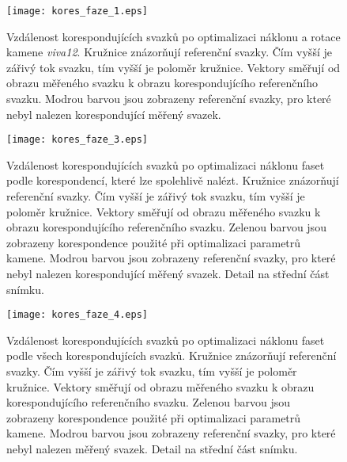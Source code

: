  
 \begin{figure}[htbp]
    \centering\texttt{[image: kores\_faze\_1.eps]}
    \caption[Vzdálenost korespondujících svazků - fáze 0.]{Vzdálenost korespondujících svazků po optimalizaci náklonu a rotace kamene \textit{viva12}. Kružnice znázorňují referenční svazky. Čím vyšší je zářivý tok svazku, tím vyšší je poloměr kružnice. Vektory směřují od obrazu měřeného svazku k obrazu korespondujícího referenčního svazku. Modrou barvou jsou zobrazeny referenční svazky, pro které nebyl nalezen korespondující měřený svazek.}
 \label{fig: kores_faze_0}
 \end{figure}

 
 \begin{figure}[htbp]
    \centering\texttt{[image: kores\_faze\_3.eps]}
    \caption[Vzdálenost korespondujících svazků - fáze 1.]{Vzdálenost korespondujících svazků po optimalizaci náklonu faset podle korespondencí, které lze spolehlivě nalézt. Kružnice znázorňují referenční svazky. Čím vyšší je zářivý tok svazku, tím vyšší je poloměr kružnice. Vektory směřují od obrazu měřeného svazku k obrazu korespondujícího referenčního svazku. Zelenou barvou jsou zobrazeny korespondence použité při optimalizaci parametrů kamene. Modrou barvou jsou zobrazeny referenční svazky, pro které nebyl nalezen korespondující měřený svazek. Detail na střední část snímku.}
 \label{fig: kores_faze_1}
 \end{figure}
 
  \begin{figure}[htbp]
    \centering\texttt{[image: kores\_faze\_4.eps]}
    \caption[Vzdálenost korespondujících svazků - konečná fáze.]{Vzdálenost korespondujících svazků po optimalizaci náklonu faset podle všech korespondujících svazků. Kružnice znázorňují referenční svazky. Čím vyšší je zářivý tok svazku, tím vyšší je poloměr kružnice. Vektory směřují od obrazu měřeného svazku k obrazu korespondujícího referenčního svazku. Zelenou barvou jsou zobrazeny korespondence použité při optimalizaci parametrů kamene. Modrou barvou jsou zobrazeny referenční svazky, pro které nebyl nalezen měřený svazek. Detail na střední část snímku. }
 \label{fig: kores_faze_2}
 \end{figure}
 
 \clearpage